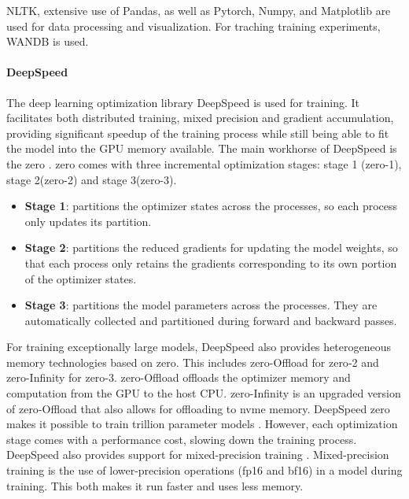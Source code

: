 NLTK, extensive use of Pandas, as well as Pytorch, Numpy, and Matplotlib are used for data processing and visualization. For traching training experiments, WANDB is used.

\paragraph{DeepSpeed}
\label{par:deepspeed}
The deep learning optimization library DeepSpeed \cite{deepspeed} is used for training. It facilitates both distributed training, mixed precision and gradient accumulation, providing significant speedup of the training process while still being able to fit the model into the GPU memory available. The main workhorse of DeepSpeed is the \acrfull{zero} \cite{zero}. \acrshort{zero} comes with three incremental optimization stages: stage 1 (\acrshort{zero}-1), stage 2(\acrshort{zero}-2) and stage 3(\acrshort{zero}-3).

\begin{itemize}
    \item \textbf{Stage 1}: partitions the optimizer states across the processes, so each process only updates its partition.
    \item \textbf{Stage 2}: partitions the reduced gradients for updating the model weights, so that each process only retains the gradients corresponding to its own portion of the optimizer states.
    \item \textbf{Stage 3}: partitions the model parameters across the processes. They are automatically collected and partitioned during forward and backward passes.
\end{itemize}

\noindent
For training exceptionally large models, DeepSpeed also provides heterogeneous memory technologies based on \acrshort{zero}. This includes \acrshort{zero}-Offload for \acrshort{zero}-2 and \acrshort{zero}-Infinity \cite{zeroinfinity} for \acrshort{zero}-3. \acrshort{zero}-Offload offloads the optimizer memory and computation from the GPU to the host CPU. \acrshort{zero}-Infinity is an upgraded version of \acrshort{zero}-Offload that also allows for offloading to \gls{nvme} memory. DeepSpeed \acrshort{zero} makes it possible to train trillion parameter models \cite{zeroinfinity}. However, each optimization stage comes with a performance cost, slowing down the training process. DeepSpeed also provides support for mixed-precision training \cite{mixedprecision}. Mixed-precision training is the use of lower-precision operations (\acrshort{fp16} and \acrshort{bf16}) in a model during training. This both makes it run faster and uses less memory.


